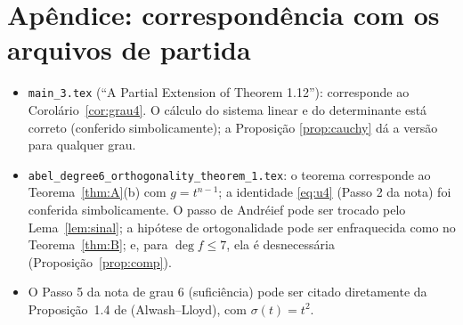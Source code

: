 \documentclass[11pt]{article}
\theoremstyle{plain}
\theoremstyle{definition}
\theoremstyle{remark}
\begin{document}
\section*{Apêndice: correspondência com os arquivos de partida}

\begin{itemize}[leftmargin=2em]
\item \texttt{main\_3.tex} (``A Partial Extension of Theorem 1.12''):
 corresponde ao Corolário~\ref{cor:grau4}. O cálculo do sistema linear e do
 determinante está correto (conferido simbolicamente); a Proposição
 \ref{prop:cauchy} dá a versão para qualquer grau.
\item \texttt{abel\_degree6\_orthogonality\_theorem\_1.tex}: o teorema
 corresponde ao Teorema~\ref{thm:A}(b) com $g=t^{n-1}$; a identidade
 \eqref{eq:u4} (Passo 2 da nota) foi conferida simbolicamente. O passo de
 Andréief pode ser trocado pelo Lema~\ref{lem:sinal}; a hipótese de
 ortogonalidade pode ser enfraquecida como no Teorema~\ref{thm:B}; e, para
 $\deg f\le7$, ela é desnecessária (Proposição~\ref{prop:comp}).
\item O Passo 5 da nota de grau 6 (suficiência) pode ser citado diretamente da
 Proposição~1.4 de \cite{ALA20} (Alwash--Lloyd), com $\sigma(t)=t^2$.
\end{itemize}
\end{document}

